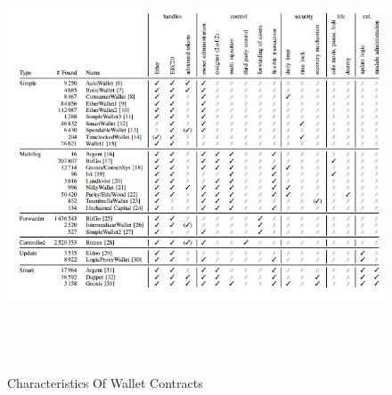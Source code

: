 \documentclass[12pt]{article}
\begin{document}
\begin{figure}[h!]
\begin{center}
\includegraphics[width=17cm, height=13cm]{L5}
\caption{Characteristics Of Wallet Contracts}
\end{center}
\end{figure}
\end{document}
